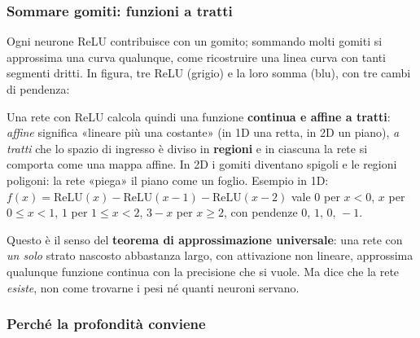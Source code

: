 \documentclass[12pt]{extarticle}
\begin{document}
\subsubsection{Sommare gomiti: funzioni a tratti}

\noindent Ogni neurone ReLU contribuisce con un gomito; sommando molti gomiti si approssima una curva qualunque, come ricostruire una linea curva con tanti segmenti dritti. In figura, tre ReLU (grigio) e la loro somma (blu), con tre cambi di pendenza:

\begin{center}
\end{center}

\noindent Una rete con ReLU calcola quindi una funzione \textbf{continua e affine a tratti}: \emph{affine} significa «lineare più una costante» (in 1D una retta, in 2D un piano), \emph{a tratti} che lo spazio di ingresso è diviso in \textbf{regioni} e in ciascuna la rete si comporta come una mappa affine. In 2D i gomiti diventano spigoli e le regioni poligoni: la rete «piega» il piano come un foglio. Esempio in 1D: $f(x)=\mathrm{ReLU}(x)-\mathrm{ReLU}(x-1)-\mathrm{ReLU}(x-2)$ vale $0$ per $x<0$, $x$ per $0\le x<1$, $1$ per $1\le x<2$, $3-x$ per $x\ge2$, con pendenze $0,\,1,\,0,\,-1$.

\noindent Questo è il senso del \textbf{teorema di approssimazione universale}: una rete con \emph{un solo} strato nascosto abbastanza largo, con attivazione non lineare, approssima qualunque funzione continua con la precisione che si vuole. Ma dice che la rete \emph{esiste}, non come trovarne i pesi né quanti neuroni servano.

\subsubsection{Perché la profondità conviene}
\end{document}
